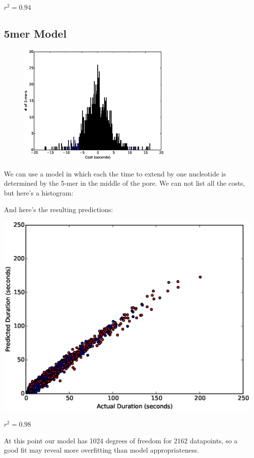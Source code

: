 \documentclass[11pt]{article}
\begin{document}
$r^2=0.94$


        \newpage
        \subsection*{5mer Model}
        \begin{figure}
        \vspace{-50pt}
        \includegraphics[width=3in]{part11hist5}
        \vspace{-70pt}
        \end{figure}
        We can use a model in which each the time to extend by one nucleotide is determined by the 5-mer in the middle of the
        pore.  We can not list all the costs, but here's a histogram:

        \vspace{1.5in}

        And here's the resulting predictions:
        
\includegraphics[width=\textwidth]{part11scatter5mer}

$r^2=0.98$



At this point our model has 1024 degrees of freedom for 2162 datapoints, so a good fit may reveal more overfitting than model appropriateness.
\end{document}
